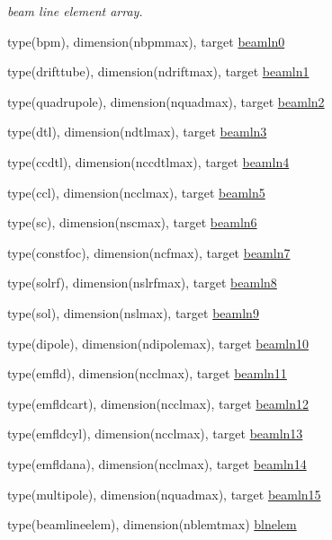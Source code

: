 \textbf{ }\par
{\em beam line element array. }\begin{DoxyCompactItemize}
\item 
type(bpm), dimension(nbpmmax), target \mbox{\hyperlink{namespaceaccsimulatorclass_a3c3a1b96070f5f9b755af7dc8502b457}{beamln0}}
\item 
type(drifttube), dimension(ndriftmax), target \mbox{\hyperlink{namespaceaccsimulatorclass_a4afbfe5b21f1ef4f6ed80b26919a5b65}{beamln1}}
\item 
type(quadrupole), dimension(nquadmax), target \mbox{\hyperlink{namespaceaccsimulatorclass_a84f0e00a948fce129634ef213a1e6146}{beamln2}}
\item 
type(dtl), dimension(ndtlmax), target \mbox{\hyperlink{namespaceaccsimulatorclass_a676f0e0a8d52bb85779983a23300d307}{beamln3}}
\item 
type(ccdtl), dimension(nccdtlmax), target \mbox{\hyperlink{namespaceaccsimulatorclass_aecdd8f634a42325f08705c6733739f5e}{beamln4}}
\item 
type(ccl), dimension(ncclmax), target \mbox{\hyperlink{namespaceaccsimulatorclass_a1fe5a7819dc79e966a915ac7109a5921}{beamln5}}
\item 
type(sc), dimension(nscmax), target \mbox{\hyperlink{namespaceaccsimulatorclass_aecb8568d8a048be9dd3f8ebf18c48e72}{beamln6}}
\item 
type(constfoc), dimension(ncfmax), target \mbox{\hyperlink{namespaceaccsimulatorclass_aee9caad06453a0e66c229bf239519041}{beamln7}}
\item 
type(solrf), dimension(nslrfmax), target \mbox{\hyperlink{namespaceaccsimulatorclass_a85003b545c7adc9e597e5fd6be9828c5}{beamln8}}
\item 
type(sol), dimension(nslmax), target \mbox{\hyperlink{namespaceaccsimulatorclass_a7685c672080dfc1af30f91257a832844}{beamln9}}
\item 
type(dipole), dimension(ndipolemax), target \mbox{\hyperlink{namespaceaccsimulatorclass_a62ff8549366c26dee5a585c8d900ebac}{beamln10}}
\item 
type(emfld), dimension(ncclmax), target \mbox{\hyperlink{namespaceaccsimulatorclass_a016c645050aaca47150651536833a42d}{beamln11}}
\item 
type(emfldcart), dimension(ncclmax), target \mbox{\hyperlink{namespaceaccsimulatorclass_aa02361c7e64269cdd2f65f92c7a44724}{beamln12}}
\item 
type(emfldcyl), dimension(ncclmax), target \mbox{\hyperlink{namespaceaccsimulatorclass_a92ae9c79c3447b1e1d8b78eb631ab3bd}{beamln13}}
\item 
type(emfldana), dimension(ncclmax), target \mbox{\hyperlink{namespaceaccsimulatorclass_a5633142ff697d3bca2adc68d9a78aedf}{beamln14}}
\item 
type(multipole), dimension(nquadmax), target \mbox{\hyperlink{namespaceaccsimulatorclass_aa020b23d82bc9d6cf8dfa7bc24b3e691}{beamln15}}
\item 
type(beamlineelem), dimension(nblemtmax) \mbox{\hyperlink{namespaceaccsimulatorclass_ab6961a98774a4f5d3d6b78342ed63e56}{blnelem}}
\end{DoxyCompactItemize}



